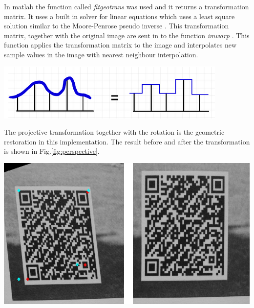 \documentclass[12pt,a4paper]{article}
\newenvironment{Figure}
  {\par\medskip\noindent\minipage{\linewidth}}
  {\endminipage\par\medskip}
\begin{document}
In matlab the function called \textit{fitgeotrans} \cite{fitgeotrans} was used and it returns a transformation matrix. It uses a built in solver for linear equations which uses a least square solution similar to the Moore-Penrose pseudo inverse \cite{mldivide}. This transformation matrix, together with the original image are sent in to the function \textit{imwarp} \cite{imwarp}. This function applies the transformation matrix to the image and interpolates new sample values in the image with nearest neighbour interpolation. 
\begin{Figure}
  \centering
    \includegraphics[width=1\linewidth]{./img/nearestnei.png}
\end{Figure}
The projective transformation together with the rotation is the geometric restoration in this implementation. The result before and after the transformation is shown in Fig.\ref{fig:perspective}.

\begin{Figure}
  \centering
    \includegraphics[width=1\linewidth]{./img/perspectivefinal.png}
\end{Figure}
\end{document}
